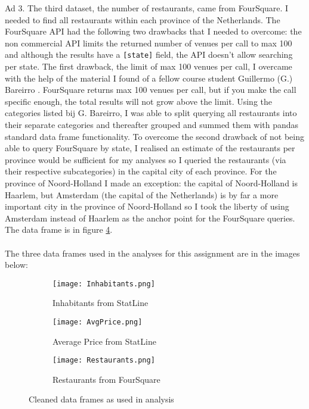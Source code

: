 Ad 3. The third dataset, the number of restaurants, came from FourSquare. I needed to find all restaurants within each province of the Netherlands. The FourSquare API had the following two drawbacks that I needed to overcome: the non commercial API limits the returned number of venues per call to max 100 and although the results have a \texttt{[state]} field, the API doesn't allow searching per state. The first drawback, the limit of max 100 venues per call, I overcame with the help of the material I found of a fellow course student Guillermo (G.) Bareirro \cite{STUDENT1}. FourSquare returns max 100 venues per call, but if you make the call specific enough, the total results will not grow above the limit. Using the categories listed bij G. Bareirro, I was able to split querying all restaurants into their separate categories and thereafter grouped and summed them with pandas standard data frame functionality. To overcome the second drawback of not being able to query FourSquare by state, I realised an estimate of the restaurants per province would be sufficient for my analyses so I queried the restaurants (via their respective subcategories) in the capital city of each province. For the province of Noord-Holland I made an exception: the capital of Noord-Holland is Haarlem, but Amsterdam (the capital of the Netherlands) is by far a more important city in the province of Noord-Holland so I took the liberty of using Amsterdam instead of Haarlem as the anchor point for the FourSquare queries. The data frame is in figure \ref{restaurants}.
\\\\
The three data frames used in the analyses for this assignment are in the images below:
\medskip
\begin{figure}[H]
	\begin{subfigure}{0.33\textwidth}
		\centering
		\texttt{[image: Inhabitants.png]} 
		\caption{Inhabitants from StatLine \cite{CBS1}}
		\label{inhabitant}
	\end{subfigure}
	\begin{subfigure}{0.33\textwidth} 
		\centering 
		\texttt{[image: AvgPrice.png]} 
		\caption{Average Price from StatLine \cite{CBS2}}
		\label{avgprice}
	\end{subfigure}
	\begin{subfigure}{0.33\textwidth}
		\centering
		\texttt{[image: Restaurants.png]} 
		\caption{Restaurants from FourSquare \cite{FS2}}
		\label{restaurants}
	\end{subfigure}
\caption{Cleaned data frames as used in analysis}
\end{figure}
